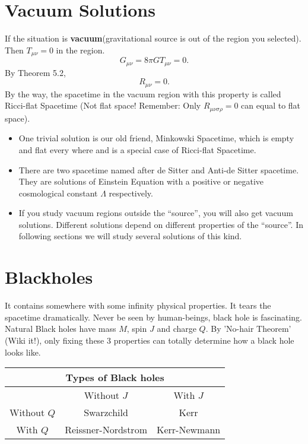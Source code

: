 \documentclass[openany,10pt]{book}
\theoremstyle{definition}
\theoremstyle{definition}
\theoremstyle{remark}
\begin{document}
\section{Vacuum Solutions}
If the situation is {\bfseries vacuum}(gravitational source is out of the region you selected). Then $ T_{\mu\nu}=0$ in the region.
\begin{equation}
    G_{\mu\nu}=8\pi G T_{\mu\nu}=0.
\end{equation}
By Theorem 5.2, \begin{equation}
    R_{\mu\nu}=0.
\end{equation}
By the way, the spacetime in the vacuum region with this property is called Ricci-flat Spacetime (Not flat space! Remember: Only $R_{\mu\nu\sigma\rho}=0$ can equal to flat space). 
\begin{itemize}
    \item One trivial solution is our old friend, Minkowski Spacetime, which is empty and flat every where and is a special case of Ricci-flat Spacetime.
    \item There are two spacetime named after de Sitter and Anti-de Sitter spacetime. They are solutions of Einstein Equation with a positive or negative cosmological constant $\Lambda$ respectively.
    \item If you study vacuum regions outside the ``source'', you will also get vacuum solutions. Different solutions depend on different properties of the ``source''.  In following sections we will study several solutions of this kind.
\end{itemize}

\section{Blackholes}
It contains somewhere with some infinity physical properties. It tears the spacetime dramatically. Never be seen by human-beings, black hole is fascinating. Natural Black holes have mass $M$, spin $J$ and charge $Q$. By 'No-hair Theorem' (Wiki it!), only fixing these 3 properties can totally determine how a black hole looks like.
 \vspace{0.35cm}

\begin{center}
\begin{tabular}{|c|c|c|}
\hline \multicolumn{3}{|c|}{Types of Black holes}\\
\hline &Without $J$&With $J$\\
\hline Without $Q$&Swarzchild&Kerr\\
\hline With $Q$&Reissner-Nordstrom&Kerr-Newmann\\
\hline
\end{tabular}
\end{center}
 \vspace{0.35cm}
\end{document}
